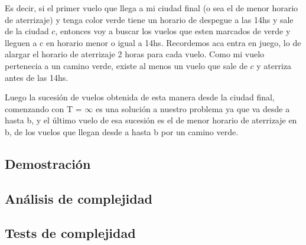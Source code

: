 Es decir, si el primer vuelo que llega a mi ciudad final (o sea el de menor horario de aterrizaje) y tenga color verde tiene un horario de despegue a las 14hs y sale de la ciudad $c$, entonces voy a buscar los vuelos que esten marcados de verde y lleguen a c en horario menor o igual a 14hs. Recordemos aca entra en juego, lo de alargar el horario de aterrizaje 2 horas para cada vuelo.
Como mi vuelo pertenecia a un camino verde, existe al menos un vuelo que sale de $c$ y aterriza antes de las 14hs.

Luego la sucesi\'on de vuelos obtenida de esta manera desde la ciudad final, comenzando con T = $\infty$ es una soluci\'on a nuestro problema ya que va desde a hasta b, y el \'ultimo vuelo de esa sucesi\'on es el de menor horario de aterrizaje en b, de los vuelos que llegan desde a hasta b por un camino verde.

\subsection{Demostración}

\subsection{Análisis de complejidad}

\subsection{Tests de complejidad}

